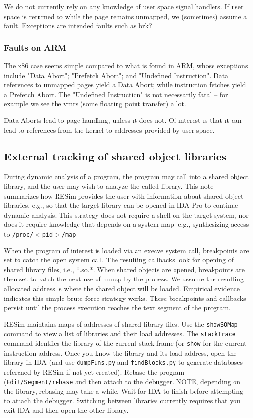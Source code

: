 \documentclass[titlepage]{article}
\begin{document}
\begin{appendices}
We do not currently rely on any knowledge of user space signal handlers.  If user space is returned to while the page remains unmapped, we (sometimes) assume a fault.
Exceptions are intended faults such as brk?

\subsubsection{Faults on ARM}
The x86 case seems simple compared to what is found in ARM, whose exceptions include "Data Abort"; "Prefetch Abort"; and "Undefined Instruction".  
Data references to unmapped pages yield a Data Abort; while instruction fetches yield a Prefetch Abort.  The "Undefined Instruction" is not necessarily fatal --
for example we see the vmrs (some floating point transfer) a lot.

Data Aborts lead to page handling, unless it does not.  Of interest is that it can lead to references from the kernel to addresses provided by user space.

\subsection{External tracking of shared object libraries}
\label{shared-libraries}
During dynamic analysis of a program, the program may call into a shared object library, and the user may wish to analyze the called library.  This note summarizes how RESim provides the user with information about shared object libraries, e.g., so that the target library can be opened in IDA Pro to continue dynamic analysis.  This strategy does not require a shell on the target system, nor does it require knowledge that depends on a system map, e.g., 
synthesizing access to {\tt /proc/$<$pid$>$/map}

When the program of interest is loaded via an execve system call, breakpoints are set to catch the open system call.  The resulting callbacks look for opening of shared library files, i.e., *.so.*.   When shared objects are opened, breakpoints are then set to catch the next use of mmap by the process.  We assume the resulting allocated address is where the shared object will be loaded.  Empirical evidence indicates this simple brute force strategy works.  These breakpoints and callbacks persist until the process execution reaches the text segment of the program.

RESim maintains maps of addresses of shared library files.  Use the {\tt showSOMap} command to view a list of libraries and their load
addresses.  The {\tt stackTrace} command identfies the library of the current stack frame (or {\tt show} for the current instruction address.
Once you know the library and its load address, open the library in IDA (and use {\tt dumpFuns.py} and {\tt findBlocks.py} to generate databases
referened by RESim if not yet created). Rebase the program ({\tt Edit/Segment/rebase} and then attach to the debugger. NOTE, depending on the library, rebasing may take a while.
Wait for IDA to finish before attempting to attach the debugger.
Switching between libraries currently requires that you exit IDA and then open the other library.


\end{appendices}
\end{document}

